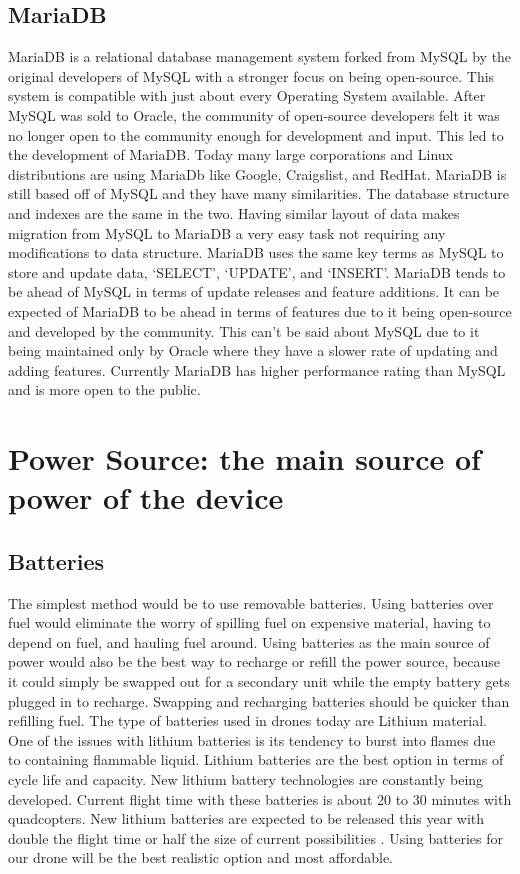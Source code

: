 \documentclass[onecolumn, draftclsnofoot,10pt, compsoc]{IEEEtran}
\begin{document}
    \subsection{MariaDB}
    MariaDB is a relational database management system forked from MySQL by the original
    developers of MySQL with a stronger focus on being open-source. This system is
    compatible with just about every Operating System available. After MySQL was sold to
    Oracle, the community of open-source developers felt it was no longer open to the
    community enough for development and input. This led to the development of MariaDB.
    Today many large corporations and Linux distributions are using MariaDb like Google,
    Craigslist, and RedHat. MariaDB is still based off of MySQL and they have many
    similarities. The database structure and indexes are the same in the two. Having
    similar layout of data makes migration from MySQL to MariaDB a very easy task not
    requiring any modifications to data structure. MariaDB uses the same key terms as MySQL
    to store and update data, ‘SELECT’, ‘UPDATE’, and ‘INSERT’. MariaDB tends to be ahead
    of MySQL in terms of update releases and feature additions. It can be expected of
    MariaDB to be ahead in terms of features due to it being open-source and developed by
    the community. This can’t be said about MySQL due to it being maintained only by Oracle
    where they have a slower rate of updating and adding features. Currently MariaDB has
    higher performance rating than MySQL and is more open to the public.

\section{Power Source: the main source of power of the device}

    \subsection{Batteries}
    The simplest method would be to use removable batteries. Using batteries over fuel
    would eliminate the worry of spilling fuel on expensive material, having to depend on
    fuel, and hauling fuel around. Using batteries as the main source of power would also
    be the best way to recharge or refill the power source, because it could simply be
    swapped out for a secondary unit while the empty battery gets plugged in to recharge.
    Swapping and recharging batteries should be quicker than refilling fuel. The type of
    batteries used in drones today are Lithium material. One of the issues with lithium
    batteries is its tendency to burst into flames due to containing flammable liquid.
    Lithium batteries are the best option in terms of cycle life and capacity. New lithium
    battery technologies are constantly being developed. Current flight time with these
    batteries is about 20 to 30 minutes with quadcopters. New lithium batteries are
    expected to be released this year with double the flight time or half the size of
    current possibilities \cite{LiBatteries}. Using batteries for our drone will be the best realistic
    option and most affordable.
\end{document}
